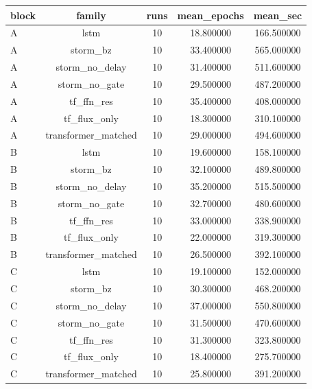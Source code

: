 \begin{tabular}{lcccc}
\toprule
block & family & runs & mean\_epochs & mean\_sec \\
\midrule
A & lstm & 10 & 18.800000 & 166.500000 \\
A & storm\_bz & 10 & 33.400000 & 565.000000 \\
A & storm\_no\_delay & 10 & 31.400000 & 511.600000 \\
A & storm\_no\_gate & 10 & 29.500000 & 487.200000 \\
A & tf\_ffn\_res & 10 & 35.400000 & 408.000000 \\
A & tf\_flux\_only & 10 & 18.300000 & 310.100000 \\
A & transformer\_matched & 10 & 29.000000 & 494.600000 \\
B & lstm & 10 & 19.600000 & 158.100000 \\
B & storm\_bz & 10 & 32.100000 & 489.800000 \\
B & storm\_no\_delay & 10 & 35.200000 & 515.500000 \\
B & storm\_no\_gate & 10 & 32.700000 & 480.600000 \\
B & tf\_ffn\_res & 10 & 33.000000 & 338.900000 \\
B & tf\_flux\_only & 10 & 22.000000 & 319.300000 \\
B & transformer\_matched & 10 & 26.500000 & 392.100000 \\
C & lstm & 10 & 19.100000 & 152.000000 \\
C & storm\_bz & 10 & 30.300000 & 468.200000 \\
C & storm\_no\_delay & 10 & 37.000000 & 550.800000 \\
C & storm\_no\_gate & 10 & 31.500000 & 470.600000 \\
C & tf\_ffn\_res & 10 & 31.300000 & 323.800000 \\
C & tf\_flux\_only & 10 & 18.400000 & 275.700000 \\
C & transformer\_matched & 10 & 25.800000 & 391.200000 \\
\bottomrule
\end{tabular}
